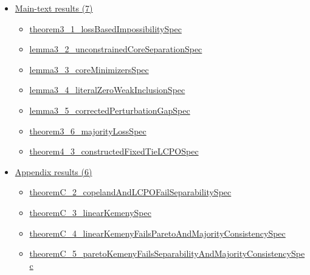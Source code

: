 \documentclass[10pt]{article}
\begin{document}
\begin{itemize}[leftmargin=1.2em]
\begin{itemize}[leftmargin=1.2em]
\end{itemize}
\item \hyperlink{source-section-a2cb018f24443c81}{Main-text results (7)}
\begin{itemize}[leftmargin=1.2em]
\item \hyperlink{source-claim-eb42e4a359411adb}{theorem3\_\allowbreak{}1\_\allowbreak{}loss\allowbreak{}Based\allowbreak{}Impossibility\allowbreak{}Spec}
\item \hyperlink{source-claim-31b67361459405c7}{lemma3\_\allowbreak{}2\_\allowbreak{}unconstrained\allowbreak{}Core\allowbreak{}Separation\allowbreak{}Spec}
\item \hyperlink{source-claim-df13a69840ea5ff9}{lemma3\_\allowbreak{}3\_\allowbreak{}core\allowbreak{}Minimizers\allowbreak{}Spec}
\item \hyperlink{source-claim-265a179612823be4}{lemma3\_\allowbreak{}4\_\allowbreak{}literal\allowbreak{}Zero\allowbreak{}Weak\allowbreak{}Inclusion\allowbreak{}Spec}
\item \hyperlink{source-claim-03ca4893d06d5c73}{lemma3\_\allowbreak{}5\_\allowbreak{}corrected\allowbreak{}Perturbation\allowbreak{}Gap\allowbreak{}Spec}
\item \hyperlink{source-claim-bbe7cd3338235aa4}{theorem3\_\allowbreak{}6\_\allowbreak{}majority\allowbreak{}Loss\allowbreak{}Spec}
\item \hyperlink{source-claim-11bcc2903523a4df}{theorem4\_\allowbreak{}3\_\allowbreak{}constructed\allowbreak{}Fixed\allowbreak{}Tie\allowbreak{}LCPO\allowbreak{}Spec}
\end{itemize}
\item \hyperlink{source-section-1cf4eccafb9ce99a}{Appendix results (6)}
\begin{itemize}[leftmargin=1.2em]
\item \hyperlink{source-claim-19bc4515dc72f018}{theorem\allowbreak{}C\_\allowbreak{}2\_\allowbreak{}copeland\allowbreak{}And\allowbreak{}LCPO\allowbreak{}Fail\allowbreak{}Separability\allowbreak{}Spec}
\item \hyperlink{source-claim-db88b9868ac40a8b}{theorem\allowbreak{}C\_\allowbreak{}3\_\allowbreak{}linear\allowbreak{}Kemeny\allowbreak{}Spec}
\item \hyperlink{source-claim-aba4949a527a8006}{theorem\allowbreak{}C\_\allowbreak{}4\_\allowbreak{}linear\allowbreak{}Kemeny\allowbreak{}Fails\allowbreak{}Pareto\allowbreak{}And\allowbreak{}Majority\allowbreak{}Consistency\allowbreak{}Spec}
\item \hyperlink{source-claim-e6c3a6a88028de60}{theorem\allowbreak{}C\_\allowbreak{}5\_\allowbreak{}pareto\allowbreak{}Kemeny\allowbreak{}Fails\allowbreak{}Separability\allowbreak{}And\allowbreak{}Majority\allowbreak{}Consistency\allowbreak{}Spec}

\end{itemize}
\end{itemize}
\end{document}
